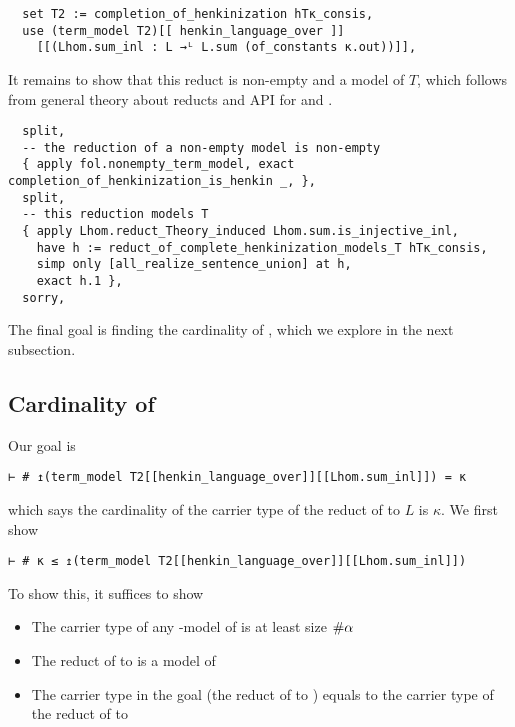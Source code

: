\begin{lstlisting}
  set T2 := completion_of_henkinization hTκ_consis,
  use (term_model T2)[[ henkin_language_over ]]
    [[(Lhom.sum_inl : L →ᴸ L.sum (of_constants κ.out))]], \end{lstlisting}

It remains to show that this reduct is non-empty and a model of $T$,
which follows from general theory about reducts and API for
 and .

\begin{lstlisting}
  split,
  -- the reduction of a non-empty model is non-empty
  { apply fol.nonempty_term_model, exact completion_of_henkinization_is_henkin _, },
  split,
  -- this reduction models T
  { apply Lhom.reduct_Theory_induced Lhom.sum.is_injective_inl,
    have h := reduct_of_complete_henkinization_models_T hTκ_consis,
    simp only [all_realize_sentence_union] at h,
    exact h.1 },
  sorry, \end{lstlisting}

The final goal is finding the cardinality of ,
which we explore in the next subsection.

\subsection{Cardinality of }

Our goal is
\begin{lstlisting}
⊢ # ↥(term_model T2[[henkin_language_over]][[Lhom.sum_inl]]) = κ \end{lstlisting}
which says the cardinality of the carrier type of the
reduct of  to $L$ is $\kappa$.
We first show
\begin{lstlisting}
⊢ # κ ≤ ↥(term_model T2[[henkin_language_over]][[Lhom.sum_inl]]) \end{lstlisting}
To show this, it suffices to show
\begin{itemize}
  \item The carrier type of any -model of
         is at least size $\# \alpha$
  \item The reduct of  to
         is a model of
  \item The carrier type in the goal (the reduct of  to )
        equals to the carrier type of the reduct of  to
\end{itemize}

